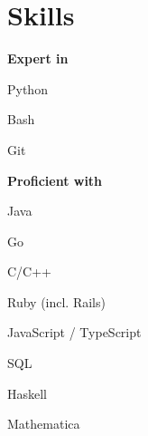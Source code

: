 \sectionsep
\section{Skills}
\textbf{Expert in}
\vspace{\topsep} %
\begin{tightemize}
\item Python
\item Bash
\item Git
\end{tightemize}
\sectionsep

\textbf{Proficient with}
\begin{tightemize}
\item Java
\item Go
\item C/C++
\item Ruby (incl. Rails)
\item JavaScript / TypeScript
\item SQL
\item Haskell
\item Mathematica
\end{tightemize}
\sectionsep
